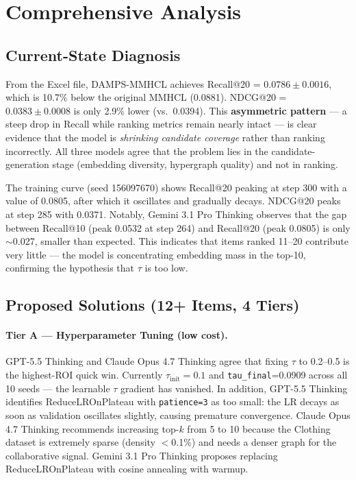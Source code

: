 \documentclass[11pt,a4paper]{article}
\begin{document}
\section{Comprehensive Analysis}

\subsection{Current-State Diagnosis}

From the Excel file, DAMPS-MMHCL achieves Recall@20 = $0.0786 \pm 0.0016$, which is 10.7\% below the original MMHCL (0.0881). NDCG@20 = $0.0383 \pm 0.0008$ is only 2.9\% lower (vs.\ 0.0394). This \textbf{asymmetric pattern} --- a steep drop in Recall while ranking metrics remain nearly intact --- is clear evidence that the model is \emph{shrinking candidate coverage} rather than ranking incorrectly. All three models agree that the problem lies in the candidate-generation stage (embedding diversity, hypergraph quality) and not in ranking.

The training curve (seed 156097670) shows Recall@20 peaking at step 300 with a value of 0.0805, after which it oscillates and gradually decays. NDCG@20 peaks at step 285 with 0.0371. Notably, Gemini 3.1 Pro Thinking observes that the gap between Recall@10 (peak 0.0532 at step 264) and Recall@20 (peak 0.0805) is only $\sim$0.027, smaller than expected. This indicates that items ranked 11--20 contribute very little --- the model is concentrating embedding mass in the top-10, confirming the hypothesis that $\tau$ is too low.

\subsection{Proposed Solutions (12+ Items, 4 Tiers)}

\paragraph{Tier A --- Hyperparameter Tuning (low cost).}
GPT-5.5 Thinking and Claude Opus 4.7 Thinking agree that fixing $\tau$ to 0.2--0.5 is the highest-ROI quick win. Currently $\tau_{\text{init}}=0.1$ and \texttt{tau\_final}=0.0909 across all 10 seeds --- the learnable $\tau$ gradient has vanished. In addition, GPT-5.5 Thinking identifies ReduceLROnPlateau with \texttt{patience=3} as too small: the LR decays as soon as validation oscillates slightly, causing premature convergence. Claude Opus 4.7 Thinking recommends increasing top-$k$ from 5 to 10 because the Clothing dataset is extremely sparse (density $<$0.1\%) and needs a denser graph for the collaborative signal. Gemini 3.1 Pro Thinking proposes replacing ReduceLROnPlateau with cosine annealing with warmup.
\end{document}
